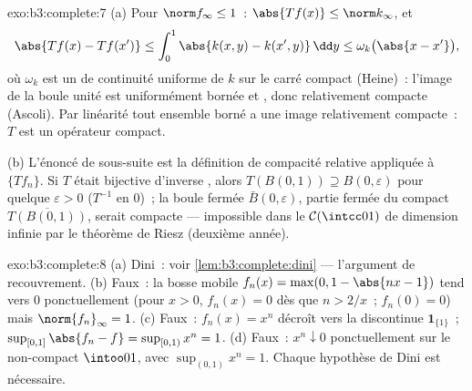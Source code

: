 \begin{solution}{exo:b3:complete:7}
(a) Pour $\norm f_\infty \leq 1$~: $\abs{Tf(x)} \leq
\norm k_\infty$, et
\[
\abs{Tf(x) - Tf(x')} \leq \int_0^1\abs{k(x,y) -
k(x',y)}\,\dd y \leq \omega_k\bigl(\abs{x - x'}\bigr),
\]
où $\omega_k$ est un  de continuité uniforme de $k$ sur
le carré compact (Heine)~: l'image de la boule unité est
uniformément bornée et , donc relativement
compacte (Ascoli). Par linéarité tout ensemble borné a une
image relativement compacte~: $T$ est un opérateur compact.

(b) L'énoncé de sous-suite est la définition de compacité
relative appliquée à $\{Tf_n\}$. Si $T$ était bijective
d'inverse , alors $T(B(0,1)) \supseteq B(0,
\varepsilon)$ pour quelque $\varepsilon > 0$ ($T^{-1}$
 en $0$)~; la boule fermée $\bar B(0,\varepsilon)$,
partie fermée du compact $\overline{T(B(0,1))}$, serait
compacte --- impossible dans le $\mathcal C(\intcc01)$ de
dimension infinie par le théorème de Riesz (deuxième année).
\end{solution}

\begin{solution}{exo:b3:complete:8}
(a) Dini~: voir \cref{lem:b3:complete:dini} --- l'argument de
recouvrement. (b) Faux~: la bosse mobile $f_n(x) = \max(0, 1
- \abs{nx - 1})$ tend vers $0$ ponctuellement (pour $x > 0$,
$f_n(x) = 0$ dès que $n > 2/x$~; $f_n(0) = 0$) mais
$\norm{f_n}_\infty = 1$. (c) Faux~: $f_n(x) = x^n$ décroît
vers la discontinue $\mathbf 1_{\{1\}}$~;
$\sup_{[0,1]}\abs{f_n - f} = \sup_{[0,1)} x^n = 1$. (d)
Faux~: $x^n \downarrow 0$ ponctuellement sur le non-compact
$\intoo01$, avec $\sup_{(0,1)}x^n = 1$. Chaque hypothèse de
Dini est nécessaire.
\end{solution}

